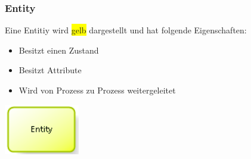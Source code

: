 \subsubsection{Entity}
\begin{minipage}[t]{0.7\textwidth}
Eine Entitiy wird \colorbox{yellow}{gelb} dargestellt und hat folgende Eigenschaften:
\begin{itemize}
    \item Besitzt einen Zustand
    \item Besitzt Attribute
    \item Wird von Prozess zu Prozess weitergeleitet
\end{itemize}
\end{minipage}
\begin{minipage}[t]{0.2\textwidth}
\includegraphics[width=0.6\linewidth]{images/simBPMN_entity.png}
\end{minipage}


